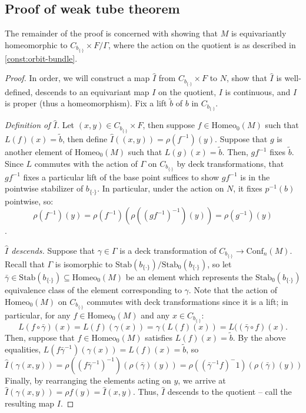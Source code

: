 \documentclass[10pt, oneside]{article}
\newcommand{\homeo}[1][S^1]{\text{Homeo}_0(#1)}
\newcommand{\conf}[2][S^1]{\text{Conf}_{#2}(#1)}
\newcommand{\set}{{\{\cdot\}}}
\newcommand{\stab}[1]{\text{Stab}(#1)}
\newcommand{\pstab}[1]{\text{Stab}_0(#1)}
\newcommand{\maxcov}{C_{b_\set}}
\theoremstyle{definition}
\theoremstyle{definition}
\begin{document}
\subsection{Proof of weak tube theorem}\label{subsec:orbit-bundle-proof}
The remainder of the proof is concerned with showing that $M$  is equivariantly homeomorphic to $\maxcov\times F/\Gamma$, where the action on the quotient is as described in \cref{const:orbit-bundle}.

\begin{proof}
    In order,
    we will construct a map $\hat{I}$ from $\maxcov \times F$ to $N$,
    show that $\hat{I}$ is well-defined,
    descends to an equivariant map $I$ on the quotient,
    $I$ is continuous, and
    $I$ is proper (thus a homeomorphism).
    Fix a lift $\tilde{b}$ of $b$ in $\maxcov$.

    \medskip
    {\it Definition of $\hat{I}$.} Let $(x, y)\in \maxcov\times F$, then
    suppose $f\in\homeo[M]$ such that $L(f)(x) = \tilde{b}$,
    then define $\hat{I}((x,y)) = \rho(f^{-1})(y)$. Suppose that $g$ is another element of $\homeo[M]$ such that $L(g)(x) = \tilde{b}$. Then, $gf^{-1}$ fixes $\tilde{b}$. Since $L$ commutes with the action of $\Gamma$ on $\maxcov$ by deck transformations, that $gf^{-1}$ fixes a particular lift of the base point suffices to show $gf^{-1}$ is in the pointwise stabilizer of $b_{\set}$. In particular, under the action on $N$, it fixes $p^{-1}(b)$ pointwise, so:
$$\rho(f^{-1})(y) = \rho(f^{-1})(\rho((gf^{-1})^{-1})(y)) = \rho(g^{-1})(y)$$.

    \medskip
    {\it $\hat{I}$ descends.} Suppose that $\gamma\in\Gamma$ is a deck transformation of $\maxcov\to \conf[M]{n}$. Recall that $\Gamma$ is isomorphic to $\stab{b_\set}/\pstab{b_\set}$, so let $\bar{\gamma}\in\stab{b_\set}\subseteq\homeo[M]$ be an element which represents the $\pstab{b_\set}$ equivalence class of the element corresponding to $\gamma$. Note that the action of $\homeo[M]$ on $\maxcov$ commutes with deck transformations since it is a lift; in particular, for any $f\in\homeo[M]$ and any $x\in\maxcov$:
    $$L(f\circ\bar{\gamma})(x) = L(f)(\gamma(x)) = \gamma(L(f)(x)) = L((\bar{\gamma}\circ f)(x).$$
    Then, suppose that $f\in\homeo[M]$ satisfies $L(f)(x) = \tilde{b}$. By the above equalities, $L(f\bar{\gamma}^{-1})(\gamma(x)) = L(f)(x) = \tilde{b}$, so $$\hat{I}(\gamma(x, y)) = \rho((f\bar{\gamma}^{-1})^{-1})(\rho(\bar{\gamma})(y)) = \rho((\bar{\gamma}^{-1}f)^-1)(\rho(\bar{\gamma})(y))$$
    Finally, by rearranging the elements acting on $y$, we arrive at $\hat{I}(\gamma(x,y)) = \rho{f}(y) = \hat{I}(x,y)$. Thus, $\hat{I}$ descends to the quotient -- call the resulting map $I$.


\end{proof}
\end{document}
